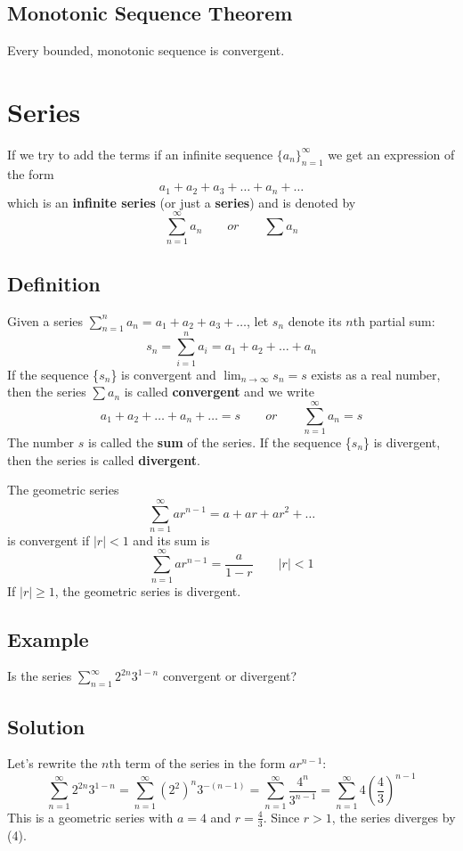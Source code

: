 \subsection*{Monotonic Sequence Theorem}
Every bounded, monotonic sequence is convergent.

\section{Series}
If we try to add the terms if an infinite sequence $\{a_n\}_{n=1}^\infty$
we get an expression of the form
$$ a_1+a_2+a_3+\dots+a_n+\dots $$
which is an \textbf{infinite series} (or just a \textbf{series}) and is denoted by
$$ \sum_{n=1}^{\infty} a_n \qquad or \qquad \sum a_n $$

\subsection*{Definition}
Given a series $\sum_{n=1}^n a_n = a_1+a_2+a_3+\dots$, let $s_n$ denote
its $n$th partial sum:
$$ s_n=\sum_{i=1}^n a_i = a_1+a_2+\dots + a_n $$
If the sequence \{$s_n$\} is convergent and $\lim_{n \to \infty} s_n =s$
exists as a real number, then the series $\sum a_n$ is called
\textbf{convergent} and we write
$$ a_1 + a_2 + \dots + a_n + \dots = s \qquad or \qquad \sum_{n=1}^\infty a_n = s$$
The number $s$ is called the \textbf{sum} of the series. If the sequence
\{$s_n$\} is divergent, then the series is called \textbf{divergent}. \par\null\par
\noindent The geometric series
$$ \sum_{n=1}^\infty ar^{n-1} = a + ar + ar^2 + \dots $$
is convergent if $|r| < 1$ and its sum is
$$ \sum_{n=1}^\infty ar^{n-1}=\frac{a}{1-r} \qquad |r|<1 $$
If $|r| \geq 1$, the geometric series is divergent.

\subsection*{Example}
Is the series $\sum_{n=1}^\infty 2^{2n}3^{1-n}$ convergent or divergent?

\subsection*{Solution}
Let's rewrite the $n$th term of the series in the form $ar^{n-1}$:
$$\sum_{n=1}^\infty 2^{2n}3^{1-n}=\sum_{n=1}^\infty (2^2)^n3^{-(n-1)}=
    \sum_{n=1}^\infty\frac{4^n}{3^{n-1}}=\sum_{n=1}^\infty 4\left(\frac{4}{3}\right)^{n-1}$$
This is a geometric series with $a=4$ and $r=\frac{4}{3}$. Since $r>1$, the series
diverges by (4).


